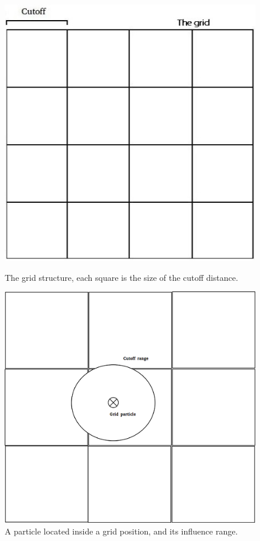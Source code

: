 \documentclass[a4paper,11pt,oneside]{book}
\begin{document}
\begin{figure}[H]
  \centering
  \begin{minipage}[b]{0.4\textwidth}
    \includegraphics[width=\textwidth]{grid.jpg}
    \caption{The grid structure, each square is the size of the cutoff distance.}
  \end{minipage}
  \begin{minipage}[b]{0.4\textwidth}
    \includegraphics[width=\textwidth]{gridexample.png}
    \caption{A particle located inside a grid position, and its influence range.}
  \end{minipage}
\end{figure}
\end{document}
